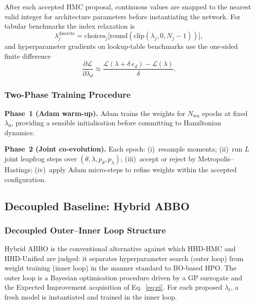 \documentclass[11pt]{article}
\theoremstyle{definition}
\begin{document}
After each accepted HMC proposal, continuous values are snapped to
the nearest valid integer for architecture parameters before
instantiating the network. For tabular benchmarks the index
relaxation is
\begin{equation}
\lambda_j^{\mathrm{discrete}} = \mathrm{choices}_j\bigl[
   \mathrm{round}(\mathrm{clip}(\lambda_j, 0, N_j-1))\bigr],
\label{eq:index_relax}
\end{equation}
and hyperparameter gradients on lookup-table benchmarks use the
one-sided finite difference
\begin{equation}
\frac{\partial\mathcal{L}}{\partial\lambda_d}
  \approx \frac{\mathcal{L}(\lambda + \delta\,e_d) -
                \mathcal{L}(\lambda)}{\delta}.
\label{eq:fd_grad}
\end{equation}

\subsubsection{Two-Phase Training Procedure}

\textbf{Phase~1 (Adam warm-up).} Adam trains the weights for
$N_{\mathrm{wu}}$ epochs at fixed $\lambda_0$, providing a sensible
initialisation before committing to Hamiltonian dynamics.

\textbf{Phase~2 (Joint co-evolution).} Each epoch: (i)~resample
momenta; (ii)~run $L$ joint leapfrog steps over
$(\theta,\lambda,p_\theta,p_\lambda)$; (iii)~accept or reject by
Metropolis--Hastings; (iv)~apply Adam micro-steps to refine weights
within the accepted configuration.

\subsection{Decoupled Baseline: Hybrid ABBO}

\subsubsection{Decoupled Outer--Inner Loop Structure}

Hybrid ABBO is the conventional alternative against which HHD-HMC and HHD-Unified are judged: it separates hyperparameter search (outer loop) from
weight training (inner loop) in the manner standard to BO-based HPO.
The outer loop is a Bayesian optimisation procedure driven by a GP
surrogate and the Expected Improvement acquisition of
Eq.~\eqref{eq:ei}. For each proposed $\lambda_t$, a fresh model is
instantiated and trained in the inner loop.
\end{document}
